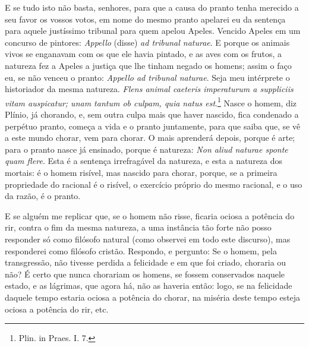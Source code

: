 E se tudo isto não basta, senhores, para que a causa do pranto tenha
merecido a seu favor os vossos votos, em nome do mesmo pranto apelarei
eu da sentença para aquele justíssimo tribunal para quem apelou Apeles.
Vencido Apeles em um concurso de pintores: \emph{Appello} (disse) \emph{ad
tribunal naturae}. E porque os animais vivos se enganavam com os que
ele havia pintado, e as aves com os frutos, a natureza fez a Apeles a
justiça que lhe tinham negado os homens; assim o faço eu, se não venceu
o pranto: \emph{Appello ad tribunal naturae}. Seja meu intérprete o
historiador da mesma natureza.
\emph{Flens animal caeteris imperaturum a suppliciis vitam auspicatur;
unam tantum ob culpam, quia natus est}.\footnote{Plin. in Praes. I. 7.} Nasce
o homem, diz Plínio, já chorando, e, sem outra culpa mais que haver
nascido, fica condenado a perpétuo pranto, começa a vida e o pranto
juntamente, para que saiba que, se vê a este mundo chorar, vem para
chorar.
O mais aprenderá depois, porque é arte; para o pranto nasce já
ensinado, porque é natureza: \emph{Non aliud naturae sponte quam flere}.
Esta é a sentença irrefragável da natureza, e esta a natureza dos
mortais: é o homem risível, mas nascido para chorar,
porque, se a primeira propriedade do racional é o risível, o exercício
próprio do mesmo racional, e o uso da razão, é o pranto.

E se alguém me replicar que, se o homem não risse, ficaria ociosa a
potência do rir, contra o fim da mesma natureza, a uma instância tão
forte não posso responder só como filósofo natural (como observei em
todo este discurso), mas responderei como filósofo cristão. Respondo, e
pergunto: Se o homem, pela transgressão, não tivesse perdida a
felicidade e em que foi criado, choraria ou não? É certo que nunca
chorariam os homens, se fossem conservados naquele estado, e as
lágrimas, que agora há, não as haveria então: logo, se na felicidade
daquele tempo estaria ociosa a potência do chorar, na miséria deste
tempo esteja ociosa a potência do rir, etc.

